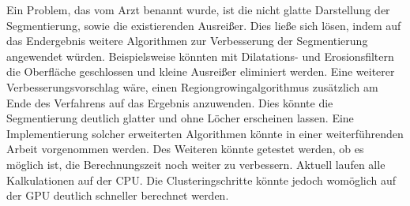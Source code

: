 \newline
Ein Problem, das vom Arzt benannt wurde, ist die nicht glatte Darstellung der Segmentierung, sowie die existierenden Ausreißer. Dies ließe sich lösen, indem auf das Endergebnis weitere Algorithmen zur Verbesserung der Segmentierung angewendet würden. Beispielsweise könnten mit Dilatations- und Erosionsfiltern die Oberfläche geschlossen und kleine Ausreißer eliminiert werden. Eine weiterer Verbesserungsvorschlag wäre, einen Regiongrowingalgorithmus zusätzlich am Ende des Verfahrens auf das Ergebnis anzuwenden. Dies könnte die Segmentierung deutlich glatter und ohne Löcher erscheinen lassen. Eine Implementierung solcher erweiterten Algorithmen könnte in einer weiterführenden Arbeit vorgenommen werden.
\newline
Des Weiteren könnte getestet werden, ob es möglich ist, die Berechnungszeit noch weiter zu verbessern. Aktuell laufen alle Kalkulationen auf der CPU. Die Clusteringschritte könnte jedoch womöglich auf der GPU deutlich schneller berechnet werden.


